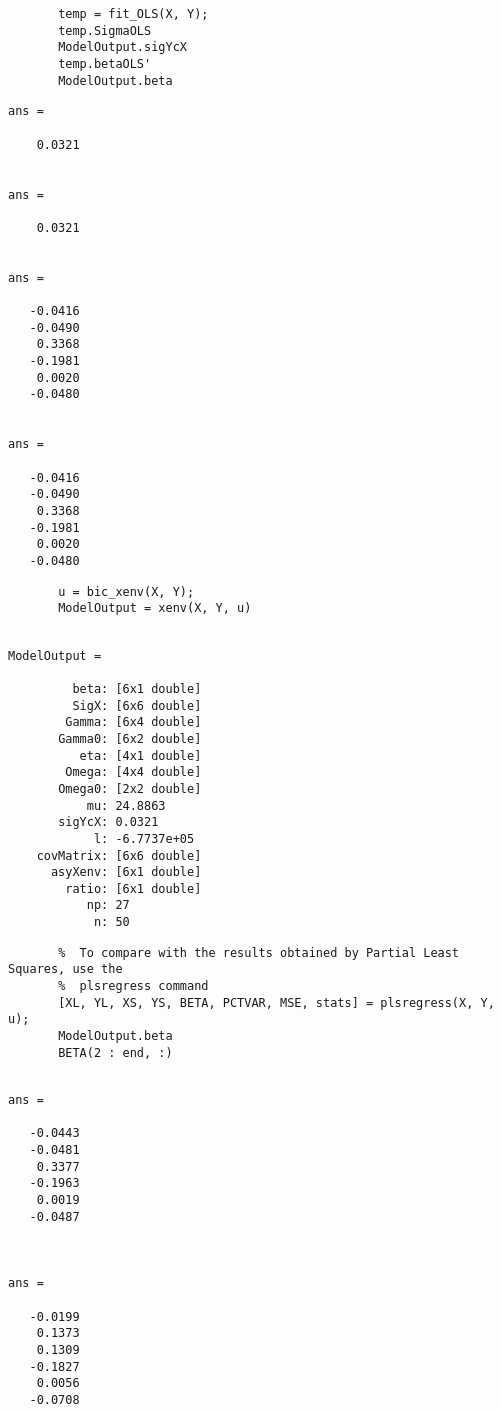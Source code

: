 \documentclass[a4paper,11pt,openany]{memoir}
\begin{document}
\begin{verbatim}       temp = fit_OLS(X, Y);
       temp.SigmaOLS
       ModelOutput.sigYcX
       temp.betaOLS'
       ModelOutput.beta\end{verbatim}
        \color{lightgray}\ttfamily \begin{verbatim}
ans =

    0.0321


ans =

    0.0321


ans =

   -0.0416
   -0.0490
    0.3368
   -0.1981
    0.0020
   -0.0480


ans =

   -0.0416
   -0.0490
    0.3368
   -0.1981
    0.0020
   -0.0480
\end{verbatim} \rmfamily
\color{black}
    
\begin{verbatim}       u = bic_xenv(X, Y);
       ModelOutput = xenv(X, Y, u)\end{verbatim}

\color{lightgray}\ttfamily \begin{verbatim}

ModelOutput = 

         beta: [6x1 double]
         SigX: [6x6 double]
        Gamma: [6x4 double]
       Gamma0: [6x2 double]
          eta: [4x1 double]
        Omega: [4x4 double]
       Omega0: [2x2 double]
           mu: 24.8863
       sigYcX: 0.0321
            l: -6.7737e+05
    covMatrix: [6x6 double]
      asyXenv: [6x1 double]
        ratio: [6x1 double]
           np: 27
            n: 50
\end{verbatim} \rmfamily
\color{black}
    
\begin{verbatim}       %  To compare with the results obtained by Partial Least Squares, use the 
       %  plsregress command
       [XL, YL, XS, YS, BETA, PCTVAR, MSE, stats] = plsregress(X, Y, u);
       ModelOutput.beta
       BETA(2 : end, :)\end{verbatim}
    

        \color{lightgray}\ttfamily \begin{verbatim}

ans =

   -0.0443
   -0.0481
    0.3377
   -0.1963
    0.0019
   -0.0487



ans =

   -0.0199
    0.1373
    0.1309
   -0.1827
    0.0056
   -0.0708

\end{verbatim} \rmfamily
\color{black}
\end{document}
